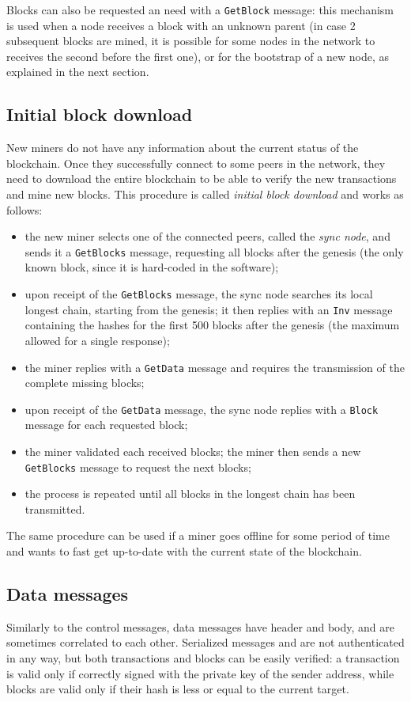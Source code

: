 \medskip
Blocks can also be requested an need with a \texttt{GetBlock} message:
this mechanism is used when a node receives a block with an unknown parent (in case \num{2} subsequent blocks are mined, it is possible for some nodes in the network to receives the second before the first one), or for the bootstrap of a new node, as explained in the next section.

\subsection{Initial block download}
New miners do not have any information about the current status of the blockchain.
Once they successfully connect to some peers in the network, they need to download the entire blockchain to be able to verify the new transactions and mine new blocks.
This procedure is called \textit{initial block download} and works as follows:
\begin{itemize}
	\item the new miner selects one of the connected peers, called the \textit{sync node}, and sends it a \texttt{GetBlocks} message, requesting all blocks after the genesis (the only known block, since it is hard-coded in the software);
	\item upon receipt of the \texttt{GetBlocks} message, the sync node searches its local longest chain, starting from the genesis; it then replies with an \texttt{Inv} message containing the hashes for the first \num{500} blocks after the genesis (the maximum allowed for a single response);
	\item the miner replies with a \texttt{GetData} message and requires the transmission of the complete missing blocks;
	\item upon receipt of the \texttt{GetData} message, the sync node replies with a \texttt{Block} message for each requested block;
	\item the miner validated each received blocks; the miner then sends a new \texttt{GetBlocks} message to request the next blocks;
	\item the process is repeated until all blocks in the longest chain has been transmitted.
\end{itemize}
The same procedure can be used if a miner goes offline for some period of time and wants to fast get up-to-date with the current state of the blockchain.

\subsection{Data messages}
Similarly to the control messages, data messages have header and body, and are sometimes correlated to each other.
Serialized messages and are not authenticated in any way, but both transactions and blocks can be easily verified:
a transaction is valid only if correctly signed with the private key of the sender address, while blocks are valid only if their hash is less or equal to the current target.

